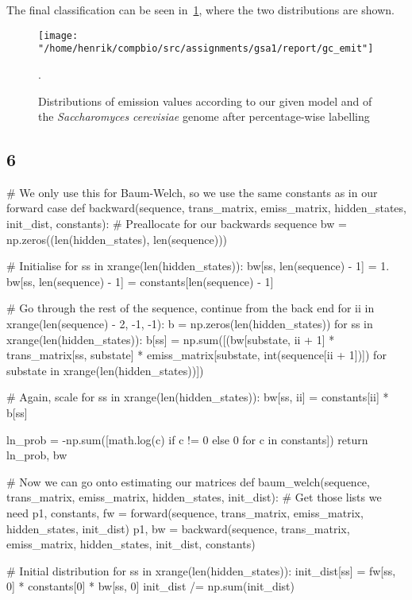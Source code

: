 \documentclass[10pt]{article}\usepackage[]{graphicx}\usepackage[]{color}
\theoremstyle{plain}
\begin{document}
The final classification can be seen in~\cref{fig:gc_emit}, where the two distributions are shown.
\begin{figure}[H]
  \centering
  \texttt{[image: "/home/henrik/compbio/src/assignments/gsa1/report/gc\_emit"]}
  \caption{Distributions of emission values according to our given model and of the \textit{Saccharomyces cerevisiae} genome after percentage-wise labelling}.
  \label{fig:gc_emit}
\end{figure}

\subsection*{6}
\begin{Schunk}
\begin{Sinput}
# We only use this for Baum-Welch, so we use the same constants as in our forward case
def backward(sequence, trans_matrix, emiss_matrix, hidden_states, init_dist, constants):
    # Preallocate for our backwards sequence
    bw = np.zeros((len(hidden_states), len(sequence)))

    # Initialise
    for ss in xrange(len(hidden_states)):
        bw[ss, len(sequence) - 1] = 1.
        bw[ss, len(sequence) - 1] = constants[len(sequence) - 1]

    # Go through the rest of the sequence, continue from the back end
    for ii in xrange(len(sequence) - 2, -1, -1):
        b = np.zeros(len(hidden_states))
        for ss in xrange(len(hidden_states)):
            b[ss] = np.sum([(bw[substate, ii + 1] * trans_matrix[ss, substate] *
                             emiss_matrix[substate, int(sequence[ii + 1])]) for substate in xrange(len(hidden_states))])

        # Again, scale
        for ss in xrange(len(hidden_states)):
            bw[ss, ii] = constants[ii] * b[ss]

    ln_prob = -np.sum([math.log(c) if c != 0 else 0 for c in constants])
    return ln_prob, bw

    
# Now we can go onto estimating our matrices
def baum_welch(sequence, trans_matrix, emiss_matrix, hidden_states, init_dist):
    # Get those lists we need
    p1, constants, fw = forward(sequence, trans_matrix, emiss_matrix, hidden_states, init_dist)
    p1, bw = backward(sequence, trans_matrix, emiss_matrix, hidden_states, init_dist, constants)

    # Initial distribution
    for ss in xrange(len(hidden_states)):
        init_dist[ss] = fw[ss, 0] * constants[0] * bw[ss, 0]
    init_dist /= np.sum(init_dist)


\end{Sinput}
\end{Schunk}
\end{document}
